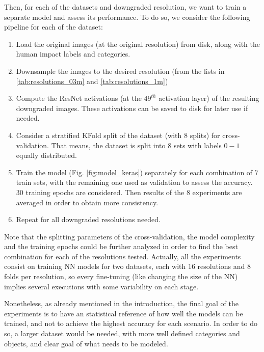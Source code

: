 Then, for each of the datasets and downgraded resolution, we want to train a separate model and assess its performance. To do so, we consider the following pipeline for each of the dataset:

\begin{enumerate}
	\item Load the original images (at the original resolution) from disk, along with the human impact labels and categories.
	
	\item Downsample the images to the desired resolution (from the lists in \ref{tab:resolutions_03m} and \ref{tab:resolutions_1m})
	
	\item Compute the ResNet activations (at the $49^{th}$ activation layer) of the resulting downgraded images. These activations can be saved to disk for later use if needed.
	
	\item Consider a stratified KFold split of the dataset (with $8$ splits) for cross-validation. That means, the dataset is split into $8$ sets with labels $0-1$ equally distributed.  
	
	\item Train the model (Fig. \ref{fig:model_keras}) separately for each combination of $7$ train sets, with the remaining one used as validation to assess the accuracy. $30$ training epochs are considered. Then results of the $8$ experiments are averaged in order to obtain more consistency.
	
	\item Repeat for all downgraded resolutions needed.
\end{enumerate}

Note that the splitting parameters of the cross-validation, the model complexity and the training epochs could be further analyzed in order to find the best combination for each of the resolutions tested. Actually, all the experiments consist on training NN models for two datasets, each with $16$ resolutions and $8$ folds per resolution, so every fine-tuning (like changing the size of the NN) implies several executions with some variability on each stage.

Nonetheless, as already mentioned in the introduction, the final goal of the experiments is to have an statistical reference of how well the models can be trained, and not to achieve the highest accuracy for each scenario. In order to do so, a larger dataset would be needed, with more well defined categories and objects, and clear goal of what needs to be modeled.

